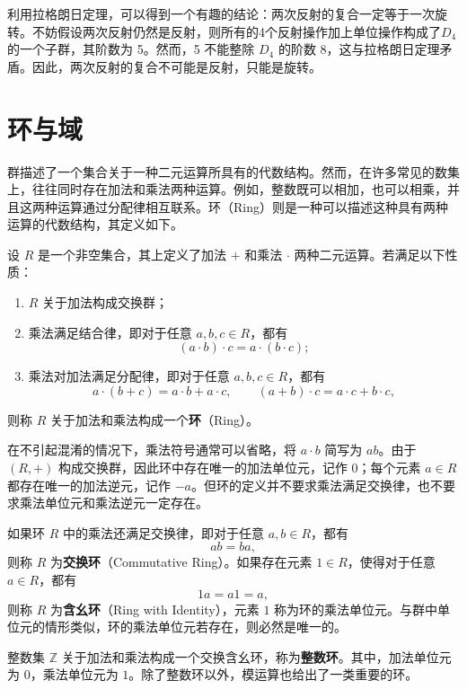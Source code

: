 利用拉格朗日定理，可以得到一个有趣的结论：两次反射的复合一定等于一次旋转。不妨假设两次反射仍然是反射，则所有的4个反射操作加上单位操作构成了\( D_4 \)的一个子群，其阶数为 5。然而，5 不能整除 \(D_4\) 的阶数 8，这与拉格朗日定理矛盾。因此，两次反射的复合不可能是反射，只能是旋转。

\section{环与域}
\label{sec_ring_field}

群描述了一个集合关于一种二元运算所具有的代数结构。然而，在许多常见的数集上，往往同时存在加法和乘法两种运算。例如，整数既可以相加，也可以相乘，并且这两种运算通过分配律相互联系。环（Ring）则是一种可以描述这种具有两种运算的代数结构，其定义如下。

\begin{definition}[环]
    \label{def_ring}
    设 \(R\) 是一个非空集合，其上定义了加法 \(+\) 和乘法 \(\cdot\) 两种二元运算。若满足以下性质：
    \begin{enumerate}
        \item \(R\) 关于加法构成交换群；
        \item 乘法满足结合律，即对于任意 \(a,b,c\in R\)，都有
              \[
                  (a \cdot b)\cdot c=a\cdot(b\cdot c);
              \]
        \item 乘法对加法满足分配律，即对于任意 \(a,b,c\in R\)，都有
              \[
                  a\cdot(b+c)=a\cdot b+a\cdot c,\qquad (a+b)\cdot c=a\cdot c+b\cdot c,
              \]
    \end{enumerate}
    则称 \(R\) 关于加法和乘法构成一个\textbf{环}（Ring）。
\end{definition}

在不引起混淆的情况下，乘法符号通常可以省略，将 \(a\cdot b\) 简写为 \(ab\)。由于 \((R,+)\) 构成交换群，因此环中存在唯一的加法单位元，记作 \(0\)；每个元素 \(a\in R\) 都存在唯一的加法逆元，记作 \(-a\)。但环的定义并不要求乘法满足交换律，也不要求乘法单位元和乘法逆元一定存在。

如果环 \(R\) 中的乘法还满足交换律，即对于任意 \(a,b\in R\)，都有
\[
    ab=ba,
\]
则称 \(R\) 为\textbf{交换环}（Commutative Ring）。如果存在元素 \(1\in R\)，使得对于任意 \(a\in R\)，都有
\[
    1a=a1=a,
\]
则称 \(R\) 为\textbf{含幺环}（Ring with Identity），元素 \(1\) 称为环的乘法单位元。与群中单位元的情形类似，环的乘法单位元若存在，则必然是唯一的。

整数集 \(\mathbb Z\) 关于加法和乘法构成一个交换含幺环，称为\textbf{整数环}。其中，加法单位元为 \(0\)，乘法单位元为 \(1\)。除了整数环以外，模运算也给出了一类重要的环。

